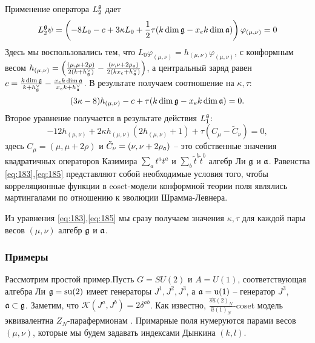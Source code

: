 Применение оператора $L_{2}^{\mathfrak{g}}$ дает
\begin{equation*}
  L_{2}^{\mathfrak{g}}\psi= \left(-8 L_{0}-c+ 3 \kappa L_{0}+\frac{1}{2}\tau (k \dim\mathfrak{g}-x_{e}k\dim\mathfrak{a})\right) \varphi_{(\mu,\nu)}=0
\end{equation*}
Здесь мы воспользовались тем, что $L_{0} \varphi_{(\mu,\nu)}=h_{(\mu,\nu)} \varphi_{(\mu,\nu)}$, с конформным весом  $h_{(\mu,\nu)}= \left(\frac{(\mu,\mu+2\rho)}{2(k+h^{\vee}_{\mathfrak{g}})}-\frac{(\nu,\nu+2\rho_{\mathfrak{a}})}{2(k x_{e}+h^{\vee}_{\mathfrak{a}})}\right)$, а центральный заряд равен $c=\frac{k\dim \mathfrak{g}}{k+h^{\vee}_{\mathfrak{g}}}-\frac{x_{e}k\dim \mathfrak{a}}{x_{e} k+h^{\vee}_{\mathfrak{a}}}$. В результате получаем соотношение на $\kappa,\tau$:
\begin{equation}
 (3\kappa-8)h_{(\mu,\nu)}-c+\tau (k\dim\mathfrak{g}-x_{e}k\dim\mathfrak{a}) =0.
 \label{eq:184}
\end{equation}
Второе уравнение получается в результате действия $L_{1}^{\mathfrak{g}}$:
\begin{equation}
\label{eq:185}
 -12 h_{(\mu,\nu)}+2\kappa h_{(\mu,\nu)} (2h_{(\mu,\nu)}+1) + \tau
(C_{\mu}-\tilde{C}_{\nu})=0,
\end{equation}
здесь $C_{\mu}=(\mu,\mu+2\rho)$ и $\tilde{C}_{\nu}=(\nu,\nu+2\rho_{\mathfrak{a}})$ -- это собственные значения квадратичных операторов Казимира $\sum_{a}t^{a}t^{a}$ и $\sum_{b}\tilde{t}^{b}\tilde{t}^{b}$ алгебр Ли $\mathfrak{g}$ и $\mathfrak{a}$.
Равенства \eqref{eq:183},\eqref{eq:185} представляют собой необходимые условия того, чтобы корреляционные функции в coset-модели конформной теории поля являлись мартингалами по отношению к эволюции Шрамма-Левнера. 

Из уравнения  \eqref{eq:183},\eqref{eq:185} мы сразу получаем значения  $\kappa,\tau$ для каждой пары весов $(\mu,\nu)$ алгебр $\mathfrak{g}$ и $\mathfrak{a}$. 

\subsubsection{Примеры}
\label{sec:examples-1}


Рассмотрим простой пример.Пусть $G=SU(2)$ и $A=U(1)$, соответствующая алгебра Ли $\mathfrak{g}=\mathrm{su}(2)$ имеет генераторы $J^{1},J^{2},J^{3}$, а $\mathfrak{a}=\mathrm{u}(1)$ -- генератор $J^{3}$, $\mathfrak{a}\subset\mathfrak{g}$.  Заметим, что $\mathcal{K}(J^{a},J^{b})=2\delta^{ab}$. Как известно,  $\frac{\hat{su}(2)_{N}}{\hat{u}(1)_{N}}$-coset модель эквивалентна  $Z_{N}$-парафермионам \cite{difrancesco1997cft}.
Примарные поля нумеруются парами весов $(\mu,\nu)$, которые мы будем задавать индексами Дынкина $(k,l)$. 

